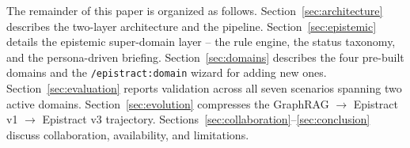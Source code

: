 The remainder of this paper is organized as follows. Section~\ref{sec:architecture} describes the two-layer architecture and the pipeline. Section~\ref{sec:epistemic} details the epistemic super-domain layer -- the rule engine, the status taxonomy, and the persona-driven briefing. Section~\ref{sec:domains} describes the four pre-built domains and the \texttt{/epistract:domain} wizard for adding new ones. Section~\ref{sec:evaluation} reports validation across all seven scenarios spanning two active domains. Section~\ref{sec:evolution} compresses the GraphRAG $\to$ Epistract v1 $\to$ Epistract v3 trajectory. Sections~\ref{sec:collaboration}--\ref{sec:conclusion} discuss collaboration, availability, and limitations.
